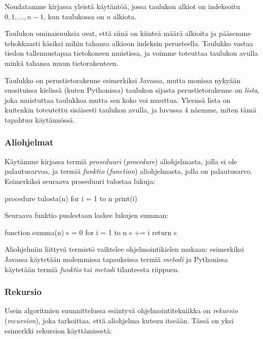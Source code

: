 Noudatamme kirjassa yleistä käytäntöä, jossa taulukon alkiot on indeksoitu
$0,1,\dots,n-1$, kun taulukossa on $n$ alkiota.

Taulukon ominaisuuksia ovat, että siinä on kiinteä määrä alkioita ja
pääsemme tehokkaasti käsiksi mihin tahansa alkioon indeksin perusteella.
Taulukko vastaa tiedon tallennustapaa tietokoneen muistissa,
ja voimme toteuttaa taulukon avulla minkä tahansa muun tietorakenteen.


Taulukko on perustietorakenne esimerkiksi Javassa,
mutta monissa nykyään suosituissa kielissä (kuten Pythonissa)
taulukon sijasta perustietorakenne on \emph{lista},
joka muistuttaa taulukkoa mutta sen koko voi muuttua.
Yleensä lista on kuitenkin toteutettu sisäisesti taulukon avulla,
ja luvussa 4 näemme, miten tämä tapahtuu käytännössä.

\subsubsection{Aliohjelmat}


Käytämme kirjassa termiä \emph{proseduuri} (\emph{procedure})
aliohjelmasta, jolla ei ole palautusarvoa,
ja termiä \emph{funktio} (\emph{function}) aliohjelmasta, jolla on palautusarvo.
Esimerkiksi seuraava proseduuri tulostaa lukuja:

\begin{code}
procedure tulosta(n)
    for i = 1 to n
        print(i)
\end{code}

Seuraava funktio puolestaan laskee lukujen summan:

\begin{code}
function summa(n)
    s = 0
    for i = 1 to n
        s += i
    return s
\end{code}

Aliohjelmiin liittyvä termistö vaihtelee ohjelmointikielen mukaan:
esimerkiksi Javassa käytetään molemmissa tapauksissa termiä
\emph{metodi} ja Pythonissa käytetään termiä \emph{funktio} tai
\emph{metodi} tilanteesta riippuen.

\subsubsection{Rekursio}


Usein algoritmien suunnittelussa esiintyvä ohjelmointitekniikka on
\emph{rekursio} (\emph{recursion}),
joka tarkoittaa, että aliohjelma kutsuu itseään.
Tässä on yksi esimerkki rekursion käyttämisestä:

